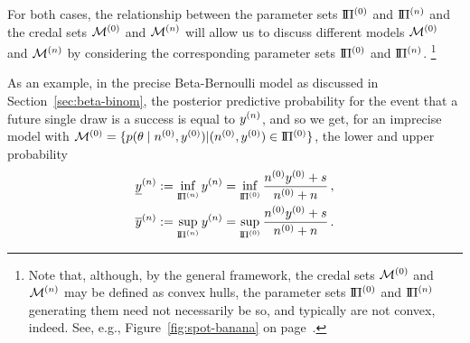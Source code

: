 For both cases, the relationship between the parameter sets $\text{I}\!\Pi^{(0)}$ and $\text{I}\!\Pi^{(n)}$ and the credal sets $\mathcal{M}^{(0)}$ and $\mathcal{M}^{(n)}$
will allow us to discuss different models $\mathcal{M}^{(0)}$ and $\mathcal{M}^{(n)}$
by considering the corresponding parameter sets $\text{I}\!\Pi^{(0)}$ and $\text{I}\!\Pi^{(n)}$.%
\footnote{Note that, although, by the general framework, the credal sets $\mathcal{M}^{(0)}$ and $\mathcal{M}^{(n)}$ may be defined as convex hulls,
the parameter sets $\text{I}\!\Pi^{(0)}$ and $\text{I}\!\Pi^{(n)}$ generating them need not necessarily be so, and typically are not convex, indeed.
See, e.g., Figure~\ref{fig:spot-banana} on page~\pageref{fig:spot-banana}.}


As an example, in the precise Beta-Bernoulli model as discussed in Section~\ref{sec:beta-binom},
the posterior predictive probability %
for the event that a future single draw is a success is equal to $y^{(n)}$, and so we get,
for an imprecise model with $\mathcal{M}^{(0)} = \{p(\theta\mid n^{(0)}, y^{(0)}) \vert (n^{(0)}, y^{(0)}) \in \text{I}\!\Pi^{(0)}\}$,
the lower and upper probability
\begin{align*}
\underline{y}^{(n)} &:= \inf_{\text{I}\!\Pi^{(n)}} y^{(n)} = \inf_{\text{I}\!\Pi^{(0)}} \frac{n^{(0)}y^{(0)} + s}{n^{(0)} +n}\,, \\
\overline{y}^{(n)} &:= \sup_{\text{I}\!\Pi^{(n)}} y^{(n)} = \sup_{\text{I}\!\Pi^{(0)}} \frac{n^{(0)}y^{(0)} + s}{n^{(0)} +n}\,.
\end{align*}

